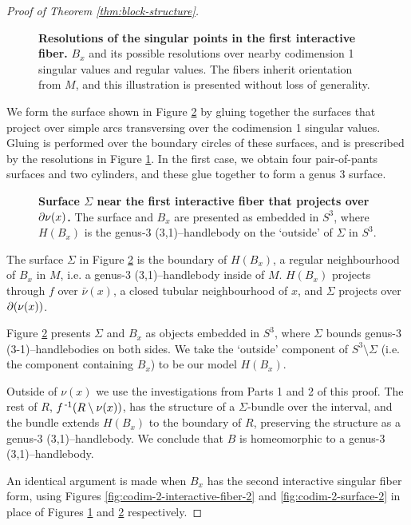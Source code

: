 \begin{proof}[Proof of Theorem \ref{thm:block-structure}]
	\begin{figure}[h!]
		\caption{
			\textbf{Resolutions of the singular points in the first interactive fiber.}
			$B_x$ and its possible resolutions over nearby codimension 1 singular values and regular values.
			The fibers inherit orientation from $M$, and this illustration is presented without loss of generality.
		}
		\label{fig:codim-2-interactive-fiber-1}
	\end{figure}

	We form the surface shown in Figure \ref{fig:codim-2-surface-1} by gluing together the surfaces that project over simple arcs transversing over the codimension 1 singular values.
	Gluing is performed over the boundary circles of these surfaces, and is prescribed by the resolutions in Figure \ref{fig:codim-2-interactive-fiber-1}.
	In the first case, we obtain four pair-of-pants surfaces and two cylinders, and these glue together to form a genus 3 surface.
	
	\begin{figure}[h!]
		\caption{
			\textbf{Surface $\Sigma$ near the first interactive fiber that projects over $\partial\nu(x)$.}
			The surface and $B_x$ are presented as embedded in $S^3$, where $H(B_x)$ is the genus-3 (3,1)--handlebody on the `outside' of $\Sigma$ in $S^3$.
		}
		\label{fig:codim-2-surface-1}
	\end{figure}
	
	The surface $\Sigma$ in Figure \ref{fig:codim-2-surface-1} is the boundary of $H(B_x)$, a regular neighbourhood of $B_x$ in $M$, i.e. a genus-3 (3,1)--handlebody inside of $M$.
	$H(B_x)$ projects through $f$ over $\bar\nu(x)$, a closed tubular neighbourhood of $x$, and $\Sigma$ projects over $\partial(\nu(x))$.
	
	Figure \ref{fig:codim-2-surface-1} presents $\Sigma$ and $B_x$ as objects embedded in $S^3$, where $\Sigma$ bounds genus-3 (3-1)--handlebodies on both sides.
	We take the `outside' component of $S^3\setminus\Sigma$ (i.e. the component containing $B_x$) to be our model $H(B_x)$.
	
	Outside of $\nu(x)$ we use the investigations from Parts 1 and 2 of this proof. The rest of $R$, $f^{\,\text{-}1}(R\setminus\nu(x))$, has the structure of a $\Sigma$-bundle over the interval, and the bundle extends $H(B_x)$ to the boundary of $R$, preserving the structure as a genus-3 (3,1)--handlebody.
	We conclude that $B$ is homeomorphic to a genus-3 (3,1)--handlebody.
	
	An identical argument is made when $B_x$ has the second interactive singular fiber form, using Figures \ref{fig:codim-2-interactive-fiber-2} and \ref{fig:codim-2-surface-2} in place of Figures \ref{fig:codim-2-interactive-fiber-1} and \ref{fig:codim-2-surface-1} respectively.
	

\end{proof}
